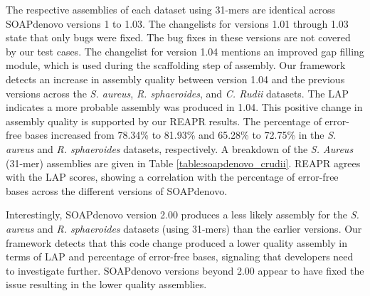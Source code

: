 The respective assemblies of each dataset using 31-mers are identical across SOAPdenovo versions 1 to 1.03.
The changelists for versions 1.01 through 1.03 state that only bugs were fixed.
The bug fixes in these versions are not covered by our test cases.
The changelist for version 1.04 mentions an improved gap filling module, which is used during the scaffolding step of assembly.
Our framework detects an increase in assembly quality between version 1.04 and the previous versions across the \emph{S. aureus}, \emph{R. sphaeroides}, and \emph{C. Rudii} datasets.
The LAP indicates a more probable assembly was produced in 1.04.
This positive change in assembly quality is supported by our REAPR results.
The percentage of error-free bases increased from 78.34\% to 81.93\% and 65.28\% to 72.75\% in the \emph{S. aureus} and \emph{R. sphaeroides} datasets, respectively.
A breakdown of the \emph{S. Aureus} (31-mer) assemblies are given in Table \ref{table:soapdenovo_crudii}.
REAPR agrees with the LAP scores, showing a correlation with the percentage of error-free bases across the different versions of SOAPdenovo.

Interestingly, SOAPdenovo version 2.00 produces a less likely assembly for the \emph{S. aureus} and \emph{R. sphaeroides} datasets (using 31-mers) than the earlier versions.
Our framework detects that this code change produced a lower quality assembly in terms of LAP and percentage of error-free bases, signaling that developers need to investigate further.
SOAPdenovo versions beyond 2.00 appear to have fixed the issue resulting in the lower quality assemblies.




\renewcommand{\baselinestretch}{1}
\small\normalsize


